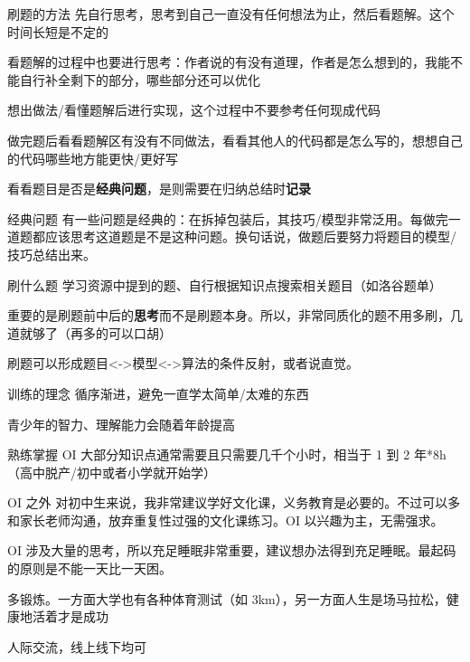 \documentclass[11pt,aspectratio=169]{beamer}
\begin{document}
\begin{frame}{刷题的方法}
    先自行思考，思考到自己一直没有任何想法为止，然后看题解。这个时间长短是不定的

    看题解的过程中也要进行思考：作者说的有没有道理，作者是怎么想到的，我能不能自行补全剩下的部分，哪些部分还可以优化

    想出做法/看懂题解后进行实现，这个过程中不要参考任何现成代码

    做完题后看看题解区有没有不同做法，看看其他人的代码都是怎么写的，想想自己的代码哪些地方能更快/更好写

    看看题目是否是\textbf{经典问题}，是则需要在归纳总结时\textbf{记录}
\end{frame}

\begin{frame}{经典问题}
    有一些问题是经典的：在拆掉包装后，其技巧/模型非常泛用。每做完一道题都应该思考这道题是不是这种问题。换句话说，做题后要努力将题目的模型/技巧总结出来。
\end{frame}

\begin{frame}{刷什么题}
    学习资源中提到的题、自行根据知识点搜索相关题目（如洛谷题单）

    重要的是刷题前中后的\textbf{思考}而不是刷题本身。所以，非常同质化的题不用多刷，几道就够了（再多的可以口胡）

    刷题可以形成题目<->模型<->算法的条件反射，或者说直觉。
\end{frame}

\begin{frame}{训练的理念}
    循序渐进，避免一直学太简单/太难的东西

    青少年的智力、理解能力会随着年龄提高

    熟练掌握 OI 大部分知识点通常需要且只需要几千个小时，相当于 1 到 2 年*8h（高中脱产/初中或者小学就开始学） 
\end{frame}

\begin{frame}{OI 之外}
    对初中生来说，我非常建议学好文化课，义务教育是必要的。不过可以多和家长老师沟通，放弃重复性过强的文化课练习。OI 以兴趣为主，无需强求。

    OI 涉及大量的思考，所以充足睡眠非常重要，建议想办法得到充足睡眠。最起码的原则是不能一天比一天困。

    多锻炼。一方面大学也有各种体育测试（如 3km），另一方面人生是场马拉松，健康地活着才是成功

    人际交流，线上线下均可
\end{frame}
\end{document}
